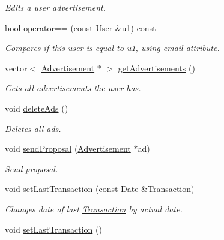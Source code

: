 \begin{DoxyCompactItemize}
\begin{DoxyCompactList}\small\item\em Edits a user advertisement. \end{DoxyCompactList}\item 
bool \hyperlink{class_user_aa141a81fd5094fea55f53126a94a0342}{operator==} (const \hyperlink{class_user}{User} \&u1) const 
\begin{DoxyCompactList}\small\item\em Compares if this user is equal to u1, using email attribute. \end{DoxyCompactList}\item 
vector$<$ \hyperlink{class_advertisement}{Advertisement} $\ast$ $>$ \hyperlink{class_user_af0392c9bec07c5dae9f267437189ab3b}{get\+Advertisements} ()
\begin{DoxyCompactList}\small\item\em Gets all advertisements the user has. \end{DoxyCompactList}\item 
\hypertarget{class_user_a9e9f5d5cc0627f130ff2739ea57d3366}{}void \hyperlink{class_user_a9e9f5d5cc0627f130ff2739ea57d3366}{delete\+Ads} ()\label{class_user_a9e9f5d5cc0627f130ff2739ea57d3366}

\begin{DoxyCompactList}\small\item\em Deletes all ads. \end{DoxyCompactList}\item 
void \hyperlink{class_user_a4031747d31b3db06c9b7f5c25a1ebe11}{send\+Proposal} (\hyperlink{class_advertisement}{Advertisement} $\ast$ad)
\begin{DoxyCompactList}\small\item\em Send proposal. \end{DoxyCompactList}\item 
void \hyperlink{class_user_a4cc6f6412af7f96f37fe59c76960d2ae}{set\+Last\+Transaction} (const \hyperlink{class_date}{Date} \&\hyperlink{class_transaction}{Transaction})
\begin{DoxyCompactList}\small\item\em Changes date of last \hyperlink{class_transaction}{Transaction} by actual date. \end{DoxyCompactList}\item 
\hypertarget{class_user_addce39c8b679237c117304afdd224800}{}void \hyperlink{class_user_addce39c8b679237c117304afdd224800}{set\+Last\+Transaction} ()\label{class_user_addce39c8b679237c117304afdd224800}


\end{DoxyCompactItemize}
